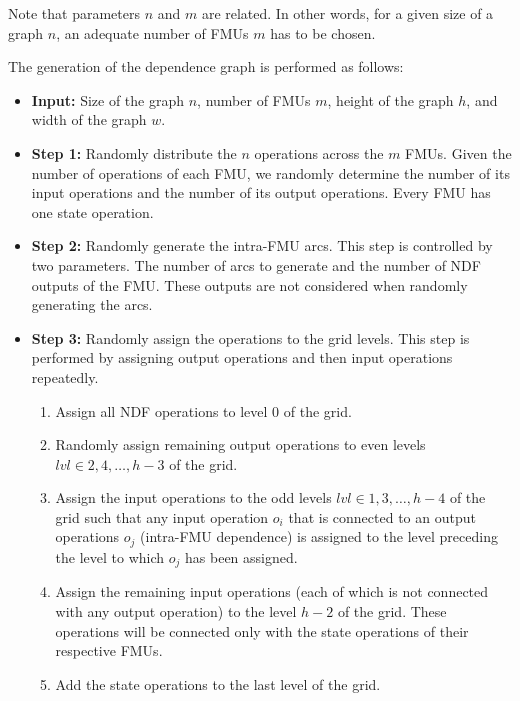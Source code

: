 Note that parameters $n$ and $m$ are related. In other words, for a given size of a graph $n$, an adequate number of FMUs $m$ has to be chosen. 

The generation of the dependence graph is performed as follows:
\begin{itemize}
\item \textbf{Input:} Size of the graph $n$, number of FMUs $m$, height of the graph $h$, and width of the graph $w$. %
\item \textbf{Step 1:} Randomly distribute the $n$ operations across the $m$ FMUs. Given the number of operations of each FMU, we randomly determine the number of its input operations and the number of its output operations. Every FMU has one state operation.
\item \textbf{Step 2:} Randomly generate the intra-FMU arcs. This step is controlled by two parameters.  The number of arcs to generate and the number of NDF outputs of the FMU. These outputs are not considered when randomly generating the arcs.
\item \textbf{Step 3:} Randomly assign the operations to the grid levels. This step is performed by assigning output operations and then input operations repeatedly.
\begin{enumerate}
\item Assign all NDF operations to level $0$ of the grid.
\item Randomly assign remaining output operations to even levels $lvl \in {2, 4, \ldots, h-3} $ of the grid.
\item Assign the input operations to the odd levels $lvl \in {1, 3, \ldots, h-4} $ of the grid such that any input operation $o_i$ that is connected to an output operations $o_j$ (intra-FMU dependence) is assigned to the level preceding the level to which $o_j$ has been assigned. 
\item Assign the remaining input operations (each of which is not connected with any output operation) to the level $h-2$ of the grid. These operations will be connected only with the state operations of their respective FMUs.
\item Add the state operations to the last level of the grid.

\end{enumerate}
\end{itemize}
